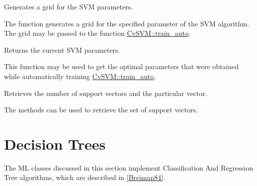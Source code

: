 
Generates a grid for the SVM parameters.


\begin{description}
\end{description}

The function generates a grid for the specified parameter of the SVM algorithm. The grid may be passed to the function \href{#CvSVM.3A.3Atrainauto}{CvSVM::train\_auto}.



Returns the current SVM parameters.


This function may be used to get the optimal parameters that were obtained while automatically training \href{#CvSVM.3A.3Atrainauto}{CvSVM::train\_auto}.



Retrieves the number of support vectors and the particular vector.


The methods can be used to retrieve the set of support vectors.

\section{Decision Trees}


The ML classes discussed in this section implement Classification And Regression Tree algorithms, which are described in \href{#paper_Breiman84}{[Breiman84]}.

